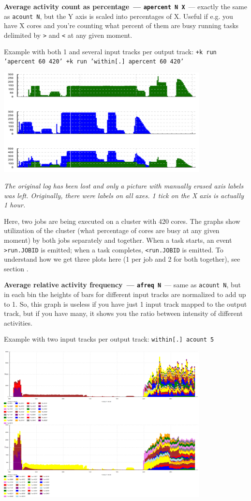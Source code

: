 \documentclass{article}
\begin{document}
\pagebreak
\noindent
\textbf{Average activity count as percentage~--- \texttt{apercent N X}}~--- exactly the same as \texttt{acount N}, but the Y axis is scaled into percentages of X. Useful if e.g. you have X cores and you're counting what percent of them are busy running tasks delimited by \texttt{>} and \texttt{<} at any given moment.

Example with both 1 and several input tracks per output track: \texttt{+k run 'apercent 60 420' +k run 'within[.] apercent 60 420'}

\centerline{\includegraphics[width=0.8\textwidth]{pics/tplot/tplot-two-different-jobs-parallelization.png}}

\emph{The original log has been lost and only a picture with manually erased axis labels was left. Originally, there were labels on all axes. 1 tick on the X axis is actually 1 hour.}

Here, two jobs are being executed on a cluster with 420 cores. The graphs show utilization of the cluster (what percentage of cores are busy at any given moment) by both jobs separately and together. When a task starts, an event \texttt{>run.JOBID} is emitted; when a task completes, \texttt{<run.JOBID} is emitted. To understand how we get three plots here (1 per job and 2 for both together), see section .

\pagebreak
\noindent
\textbf{Average relative activity frequency~--- \texttt{afreq N}}~--- same as \texttt{acount N}, but in each bin the heights of bars for different input tracks are normalized to add up to 1. So, this graph is useless if you have just 1 input track mapped to the output track, but if you have many, it shows you the ratio between intensity of different activities.

Example with two input tracks per output track: \texttt{within[.] acount 5}

\centerline{\includegraphics[width=0.8\textwidth]{pics/tplot/acount-fly-run-manyjobs.png}}
\end{document}

